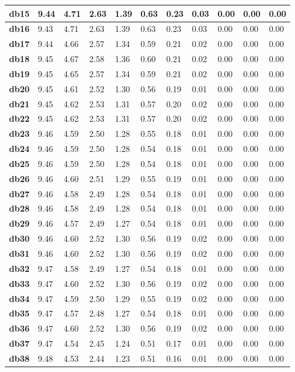 \begin{tiny}
\begin{longtable}{|l|l|l|l|l|l|l|l|l|l|l|}
\textbf{db15}&9.44&4.71&2.63&1.39&0.63&0.23&0.03&0.00&0.00&0.00\\\hline
\textbf{db16}&9.43&4.71&2.63&1.39&0.63&0.23&0.03&0.00&0.00&0.00\\\hline
\textbf{db17}&9.44&4.66&2.57&1.34&0.59&0.21&0.02&0.00&0.00&0.00\\\hline
\textbf{db18}&9.45&4.67&2.58&1.36&0.60&0.21&0.02&0.00&0.00&0.00\\\hline
\textbf{db19}&9.45&4.65&2.57&1.34&0.59&0.21&0.02&0.00&0.00&0.00\\\hline
\textbf{db20}&9.45&4.61&2.52&1.30&0.56&0.19&0.01&0.00&0.00&0.00\\\hline
\textbf{db21}&9.45&4.62&2.53&1.31&0.57&0.20&0.02&0.00&0.00&0.00\\\hline
\textbf{db22}&9.45&4.62&2.53&1.31&0.57&0.20&0.02&0.00&0.00&0.00\\\hline
\textbf{db23}&9.46&4.59&2.50&1.28&0.55&0.18&0.01&0.00&0.00&0.00\\\hline
\textbf{db24}&9.46&4.59&2.50&1.28&0.54&0.18&0.01&0.00&0.00&0.00\\\hline
\textbf{db25}&9.46&4.59&2.50&1.28&0.54&0.18&0.01&0.00&0.00&0.00\\\hline
\textbf{db26}&9.46&4.60&2.51&1.29&0.55&0.19&0.01&0.00&0.00&0.00\\\hline
\textbf{db27}&9.46&4.58&2.49&1.28&0.54&0.18&0.01&0.00&0.00&0.00\\\hline
\textbf{db28}&9.46&4.58&2.49&1.28&0.54&0.18&0.01&0.00&0.00&0.00\\\hline
\textbf{db29}&9.46&4.57&2.49&1.27&0.54&0.18&0.01&0.00&0.00&0.00\\\hline
\textbf{db30}&9.46&4.60&2.52&1.30&0.56&0.19&0.02&0.00&0.00&0.00\\\hline
\textbf{db31}&9.46&4.60&2.52&1.30&0.56&0.19&0.02&0.00&0.00&0.00\\\hline
\textbf{db32}&9.47&4.58&2.49&1.27&0.54&0.18&0.01&0.00&0.00&0.00\\\hline
\textbf{db33}&9.47&4.60&2.52&1.30&0.56&0.19&0.02&0.00&0.00&0.00\\\hline
\textbf{db34}&9.47&4.59&2.50&1.29&0.55&0.19&0.02&0.00&0.00&0.00\\\hline
\textbf{db35}&9.47&4.57&2.48&1.27&0.54&0.18&0.01&0.00&0.00&0.00\\\hline
\textbf{db36}&9.47&4.60&2.52&1.30&0.56&0.19&0.02&0.00&0.00&0.00\\\hline
\textbf{db37}&9.47&4.54&2.45&1.24&0.51&0.17&0.01&0.00&0.00&0.00\\\hline
\textbf{db38}&9.48&4.53&2.44&1.23&0.51&0.16&0.01&0.00&0.00&0.00\\\hline

\end{longtable}
\end{tiny}
